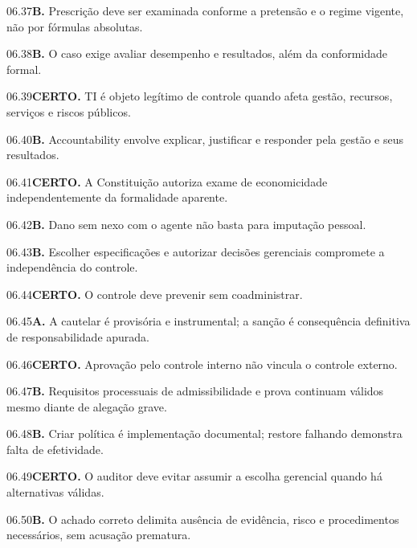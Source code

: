 \begin{solucao}{06.37}\textbf{B.} Prescrição deve ser examinada conforme a pretensão e o regime vigente, não por fórmulas absolutas.\end{solucao}
\begin{solucao}{06.38}\textbf{B.} O caso exige avaliar desempenho e resultados, além da conformidade formal.\end{solucao}
\begin{solucao}{06.39}\textbf{CERTO.} TI é objeto legítimo de controle quando afeta gestão, recursos, serviços e riscos públicos.\end{solucao}
\begin{solucao}{06.40}\textbf{B.} Accountability envolve explicar, justificar e responder pela gestão e seus resultados.\end{solucao}
\begin{solucao}{06.41}\textbf{CERTO.} A Constituição autoriza exame de economicidade independentemente da formalidade aparente.\end{solucao}
\begin{solucao}{06.42}\textbf{B.} Dano sem nexo com o agente não basta para imputação pessoal.\end{solucao}
\begin{solucao}{06.43}\textbf{B.} Escolher especificações e autorizar decisões gerenciais compromete a independência do controle.\end{solucao}
\begin{solucao}{06.44}\textbf{CERTO.} O controle deve prevenir sem coadministrar.\end{solucao}
\begin{solucao}{06.45}\textbf{A.} A cautelar é provisória e instrumental; a sanção é consequência definitiva de responsabilidade apurada.\end{solucao}
\begin{solucao}{06.46}\textbf{CERTO.} Aprovação pelo controle interno não vincula o controle externo.\end{solucao}
\begin{solucao}{06.47}\textbf{B.} Requisitos processuais de admissibilidade e prova continuam válidos mesmo diante de alegação grave.\end{solucao}
\begin{solucao}{06.48}\textbf{B.} Criar política é implementação documental; restore falhando demonstra falta de efetividade.\end{solucao}
\begin{solucao}{06.49}\textbf{CERTO.} O auditor deve evitar assumir a escolha gerencial quando há alternativas válidas.\end{solucao}
\begin{solucao}{06.50}\textbf{B.} O achado correto delimita ausência de evidência, risco e procedimentos necessários, sem acusação prematura.\end{solucao}
